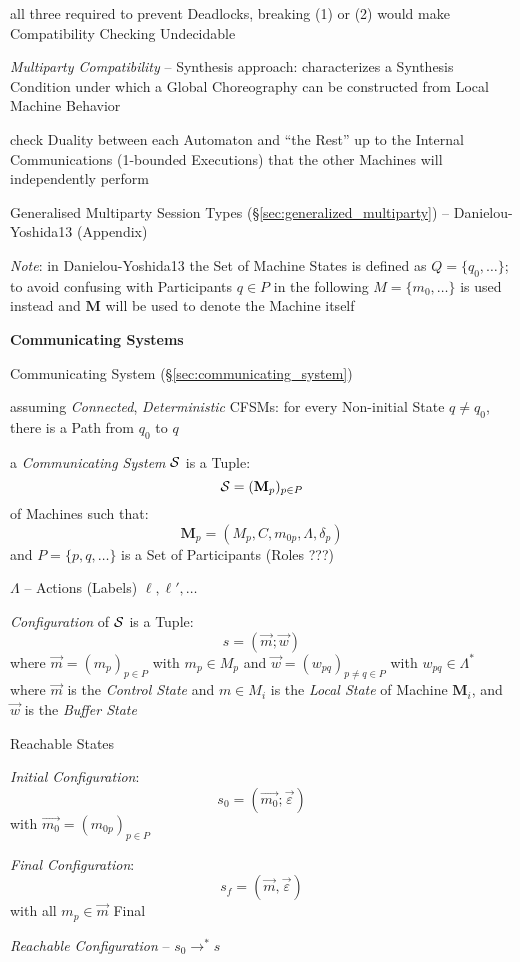 all three required to prevent Deadlocks, breaking (1) or (2) would
make Compatibility Checking Undecidable

\emph{Multiparty Compatibility} -- Synthesis approach: characterizes a
Synthesis Condition under which a Global Choreography can be
constructed from Local Machine Behavior

check Duality between each Automaton and ``the Rest'' up to the
Internal Communications (1-bounded Executions) that the other Machines
will independently perform

Generalised Multiparty Session Types
(\S\ref{sec:generalized_multiparty}) -- Danielou-Yoshida13 (Appendix)

\fist \emph{Note}: in Danielou-Yoshida13 the Set of Machine States is
defined as $Q = \{q_0,\ldots\}$; to avoid confusing with Participants
$q \in P$ in the following $M = \{m_0, \ldots\}$ is used instead and
$\mathbf{M}$ will be used to denote the Machine itself


\textbf{Communicating Systems}

\fist Communicating System (\S\ref{sec:communicating_system})

assuming \emph{Connected}, \emph{Deterministic} CFSMs: for every
Non-initial State $q \neq q_0$, there is a Path from $q_0$ to $q$

a \emph{Communicating System} $\mathcal{S}$ is a Tuple:
\[
  \mathcal{S} = (\mathbf{M}_p)_{p \in P}
\]
of Machines such that:
\[
  \mathbf{M}_p = (M_p, C, m_{0p}, \Lambda, \delta_p)
\]
and $P = \{p, q, \ldots\}$ is a Set of Participants (Roles ???) %

$\Lambda$ -- Actions (Labels) $\ell, \ell', \ldots$

\emph{Configuration} of $\mathcal{S}$ is a Tuple:
\[
  s = (\vec{m};\vec{w})
\]
where $\vec{m} = (m_p)_{p \in P}$ with $m_p \in M_p$ and $\vec{w} =
(w_{pq})_{p \neq q \in P}$ with $w_{pq} \in \Lambda^*$ where $\vec{m}$
is the \emph{Control State} and $m \in M_i$ is the \emph{Local State}
of Machine $\mathbf{M}_i$, and $\vec{w}$ is the \emph{Buffer State}

Reachable States

\emph{Initial Configuration}:
\[
  s_0 = (\vec{m_0};\vec{\varepsilon})
\]
with $\vec{m_0} = (m_{0p})_{p \in P}$

\emph{Final Configuration}:
\[
  s_f = (\vec{m}, \vec{\varepsilon})
\]
with all $m_p \in \vec{m}$ Final

\emph{Reachable Configuration} -- $s_0 \rightarrow^* s$

